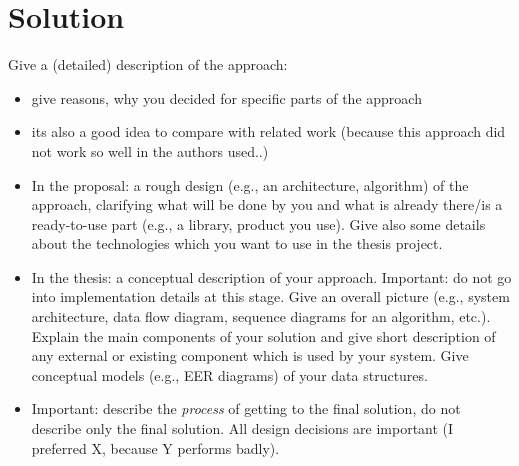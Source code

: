 \chapter{Solution}
\label{cha:solutioni}

Give a (detailed) description of the approach:

\begin{itemize}
\item give reasons, why you decided for specific parts of the approach
\item its also a good idea to compare with related work (because this
		  approach did not work so well in \cite{conf/vldb/KenscheQXlYl07} the authors used..)
\item In the proposal: a rough design (e.g., an architecture, algorithm) of the approach,
		  clarifying what will be done by you and what is already there/is a ready-to-use part
		  (e.g., a library, product you use). Give also some details about the technologies
		  which you want to use in the thesis project.
\item In the thesis: a conceptual description of your approach. Important: do not go into
      implementation details at this stage. Give an overall picture (e.g., system architecture, data flow
      diagram, sequence diagrams for an algorithm, etc.). Explain the main components of your solution
      and give short description of any external or existing component which is used by your system.
      Give conceptual models (e.g., EER diagrams) of your data structures.
\item Important: describe the \emph{process} of getting to the final solution, do
      not describe only the final solution. All design decisions are important (I preferred
      X, because Y performs badly).
\end{itemize}

